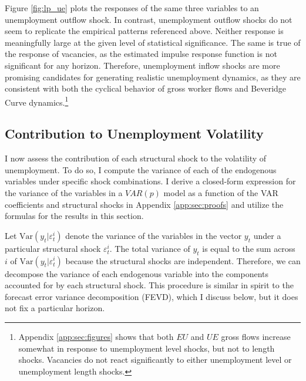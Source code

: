 \documentclass[12pt]{article}
\newcommand{\Var}{\mathrm{Var}}
\begin{document}
Figure \ref{fig:lp_ue} plots the responses of the same three variables to an unemployment outflow shock. In contrast, unemployment outflow shocks do not seem to replicate the empirical patterns referenced above. Neither response is meaningfully large at the given level of statistical significance. The same is true of the response of vacancies, as the estimated impulse response function is not significant for any horizon. Therefore, unemployment inflow shocks are more promising candidates for generating realistic unemployment dynamics, as they are consistent with both the cyclical behavior of gross worker flows and Beveridge Curve dynamics.\footnote{Appendix \ref{app:sec:figures} shows that both $EU$ and $UE$ gross flows increase somewhat in response to unemployment level shocks, but not to length shocks. Vacancies do not react significantly to either unemployment level or unemployment length shocks.}

\subsection{Contribution to Unemployment Volatility}

I now assess the contribution of each structural shock to the volatility of unemployment. To do so, I compute the variance of each of the endogenous variables under specific shock combinations. I derive a closed-form expression for the variance of the variables in a $VAR(p)$ model as a function of the VAR coefficients and structural shocks in Appendix \ref{app:sec:proofs} and utilize the formulas for the results in this section.

Let $\Var(y_t | \varepsilon^i_t)$ denote the variance of the variables in the vector $y_t$ under a particular structural shock $\varepsilon^i_t$. The total variance of $y_t$ is equal to the sum across $i$ of $\Var(y_t | \varepsilon^i_t)$ because the structural shocks are independent. Therefore, we can decompose the variance of each endogenous variable into the components accounted for by each structural shock. This procedure is similar in spirit to the forecast error variance decomposition (FEVD), which I discuss below, but it does not fix a particular horizon.
\end{document}
